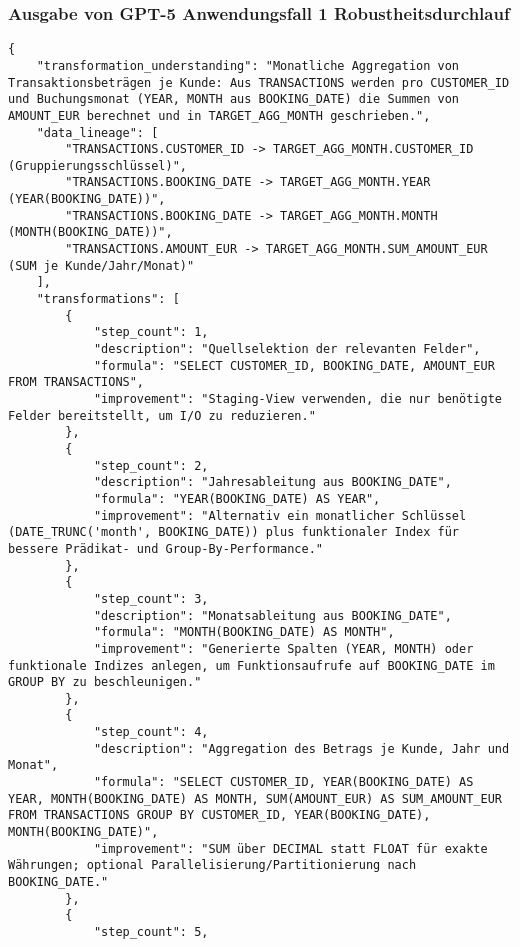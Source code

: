 \subsubsection{Ausgabe von GPT-5 Anwendungsfall 1 Robustheitsdurchlauf}\label{anhang:subsubsec:gpt_case1_prompt3}
\begin{lstlisting}[caption={Ausgabe: GPT-5 Anwendungsfall 1 Robustheitsdurchlauf},label={gpt_case1_prompt3}]
{
    "transformation_understanding": "Monatliche Aggregation von Transaktionsbeträgen je Kunde: Aus TRANSACTIONS werden pro CUSTOMER_ID und Buchungsmonat (YEAR, MONTH aus BOOKING_DATE) die Summen von AMOUNT_EUR berechnet und in TARGET_AGG_MONTH geschrieben.",
    "data_lineage": [
        "TRANSACTIONS.CUSTOMER_ID -> TARGET_AGG_MONTH.CUSTOMER_ID (Gruppierungsschlüssel)",
        "TRANSACTIONS.BOOKING_DATE -> TARGET_AGG_MONTH.YEAR (YEAR(BOOKING_DATE))",
        "TRANSACTIONS.BOOKING_DATE -> TARGET_AGG_MONTH.MONTH (MONTH(BOOKING_DATE))",
        "TRANSACTIONS.AMOUNT_EUR -> TARGET_AGG_MONTH.SUM_AMOUNT_EUR (SUM je Kunde/Jahr/Monat)"
    ],
    "transformations": [
        {
            "step_count": 1,
            "description": "Quellselektion der relevanten Felder",
            "formula": "SELECT CUSTOMER_ID, BOOKING_DATE, AMOUNT_EUR FROM TRANSACTIONS",
            "improvement": "Staging-View verwenden, die nur benötigte Felder bereitstellt, um I/O zu reduzieren."
        },
        {
            "step_count": 2,
            "description": "Jahresableitung aus BOOKING_DATE",
            "formula": "YEAR(BOOKING_DATE) AS YEAR",
            "improvement": "Alternativ ein monatlicher Schlüssel (DATE_TRUNC('month', BOOKING_DATE)) plus funktionaler Index für bessere Prädikat- und Group-By-Performance."
        },
        {
            "step_count": 3,
            "description": "Monatsableitung aus BOOKING_DATE",
            "formula": "MONTH(BOOKING_DATE) AS MONTH",
            "improvement": "Generierte Spalten (YEAR, MONTH) oder funktionale Indizes anlegen, um Funktionsaufrufe auf BOOKING_DATE im GROUP BY zu beschleunigen."
        },
        {
            "step_count": 4,
            "description": "Aggregation des Betrags je Kunde, Jahr und Monat",
            "formula": "SELECT CUSTOMER_ID, YEAR(BOOKING_DATE) AS YEAR, MONTH(BOOKING_DATE) AS MONTH, SUM(AMOUNT_EUR) AS SUM_AMOUNT_EUR FROM TRANSACTIONS GROUP BY CUSTOMER_ID, YEAR(BOOKING_DATE), MONTH(BOOKING_DATE)",
            "improvement": "SUM über DECIMAL statt FLOAT für exakte Währungen; optional Parallelisierung/Partitionierung nach BOOKING_DATE."
        },
        {
            "step_count": 5,

\end{lstlisting}
